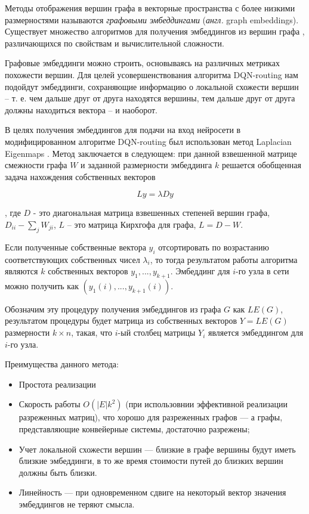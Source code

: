 \documentclass[specification,annotation,times]{itmo-student-thesis}
\theoremstyle{definition}
\begin{document}
Методы отображения вершин графа в векторные пространства с более низкими
размерностями называются \textit{графовыми эмбеддингами} (\textit{англ.} graph
embeddings). Существует множество алгоритмов для получения эмбеддингов из вершин
графа \cite{cai2018comprehensive, goyal2018graph}, различающихся по свойствам и
вычислительной сложности. 

Графовые эмбеддинги можно строить, основываясь на различных метриках похожести
вершин. Для целей усовершенствования алгоритма DQN-routing нам подойдут эмбеддинги,
сохраняющие информацию о локальной схожести вершин -- т. е. чем дальше друг от
друга находятся вершины, тем дальше друг от друга должны находиться вектора -- и
наоборот.

В целях получения эмбеддингов для подачи на вход нейросети в модифицированном
алгоритме DQN-routing был использован метод Laplacian Eigenmaps
\cite{belkin2002laplacian}. Метод заключается в следующем: при данной взвешенной
матрице смежности графа $W$ и заданной размерности эмбеддинга $k$ решается
обобщенная задача нахождения собственных векторов

\begin{equation}\label{eqs:lap}
  L y = \lambda D y
\end{equation}

, где $D$ - это диагональная матрица взвешенных степеней вершин графа,
$D_{ii}-\sum_j W_{ji}$, $L$ -- это матрица Кирхгофа для графа, $L = D - W$.

Если полученные собственные вектора $y_i$ отсортировать по возрастанию
соответствующих собственных чисел $\lambda_i$, то тогда результатом работы
алгоритма являются $k$ собственных векторов $y_1, ..., y_{k+1}$.
Эмбеддинг для $i$-го узла в сети можно получить как
$(y_1(i), ..., y_{k+1}(i))$.

Обозначим эту процедуру получения эмбеддингов из графа $G$ как $LE(G)$,
результатом процедуры будет матрица из собственных векторов $Y = LE(G)$
размерности $k \times n$, такая, что $i$-ый столбец матрицы $Y_i$ является
эмбеддингом для $i$-го узла.

Преимущества данного метода:
\begin{itemize}
\item Простота реализации
\item Скорость работы $O(|E|k^2)$ \cite{goyal2018graph} (при использовнии
  эффективной реализации разреженных матриц), что хорошо для разреженных графов
  --- а графы, представляющие конвейерные системы, достаточно разрежены;
\item Учет локальной схожести вершин --- близкие в графе вершины будут иметь
  близкие эмбеддинги, в то же время стоимости путей до близких вершин должны
  быть близки.
\item Линейность --- при одновременном сдвиге на некоторый вектор значения
  эмбеддингов не теряют смысла.
\end{itemize}
\end{document}
